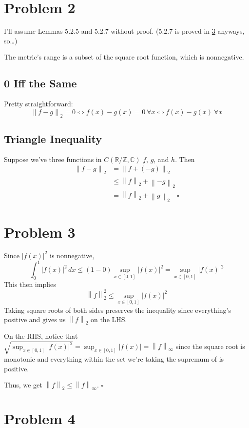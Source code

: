 \documentclass[12pt]{article}
\newcommand{\R}{\mathbb{R}}
\newcommand{\Z}{\mathbb{Z}}
\newcommand{\C}{\mathbb{C}}
\newcommand{\norm}[1]{\left\lVert#1\right\rVert}
\begin{document}
\setcounter{section}{1}

\section{Problem 2}

I'll assume Lemmas 5.2.5 and 5.2.7 without proof.
(5.2.7 is proved in \ref{sec:p4} anyways, so\dots)

The metric's range is a subset of the square root function, which is nonnegative.

\subsection{0 Iff the Same}

Pretty straightforward:
\[\norm{f-g}_2=0 \iff f(x)-g(x)=0\ \forall x \iff f(x)-g(x)\ \forall x\]

\subsection{Triangle Inequality}

Suppose we've three functions in $C(\R/\Z, \C)$ $f$, $g$, and $h$.
Then
\begin{align*}
  \norm{f-g}_2
   & = \norm{f+(-g)}_2                     \\
   & \le \norm{f}_2+\norm{-g}_2            \\
   & = \norm{f}_2 + \norm{g}_2\quad\square
\end{align*}

\section{Problem 3}

Since $|f(x)|^2$ is nonnegative,
\[\int_{0}^{1} |f(x)|^2\,dx \le (1-0)\sup_{x \in [0, 1]} |f(x)|^2 = \sup_{x \in [0, 1]} |f(x)|^2\]
This then implies
\[\norm{f}_2^2 \le \sup_{x \in [0, 1]} |f(x)|^2\]
Taking square roots of both sides preserves the inequality since everything's positive
and gives us $\norm{f}_2$ on the LHS.

On the RHS, notice that
$\sqrt{\sup_{x \in [0, 1]} |f(x)|^2} = \sup_{x \in [0, 1]} |f(x)| = \norm{f}_\infty$
since the square root is monotonic and everything within the set we're taking the
supremum of is positive.

Thus, we get $\norm{f}_2 \le \norm{f}_\infty$. $\square$

\pagebreak

\section{Problem 4}\label{sec:p4}
\end{document}
